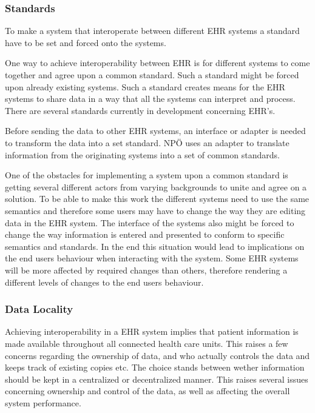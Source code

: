 \documentclass[14pt]{article}
\begin{document}
\subsubsection{Standards}
\label{sec:resultsStandards}
To make a system that interoperate between different \gls{EHR} systems a standard have to be set and forced onto the systems. 

One way to achieve interoperability between \gls{EHR} is for different systems to come together and agree upon a common standard. Such a standard might be forced upon already existing systems. Such a standard creates means for the \gls{EHR} systems to share data in a way that all the systems can interpret and process. There are several standards currently in development concerning \gls{EHR}'s.

Before sending the data to other \gls{EHR} systems, an interface or adapter is needed to transform the data into a set standard. NPÖ uses an adapter to translate information from the originating systems into a set of common standards. 

One of the obstacles for implementing a system upon a common standard is getting several different actors from varying backgrounds to unite and agree on a solution. To be able to make this work the different systems need to use the same semantics and therefore some users may have to change the way they are editing data in the \gls{EHR} system. The interface of the systems also might be forced to change the way information is entered and presented to conform to specific semantics and standards. In the end this situation would lead to implications on the end users behaviour when interacting with the system. Some \gls{EHR} systems will be more affected by required changes than others, therefore rendering a different levels of changes to the end users behaviour.

\subsubsection{Data Locality}
\label{sec:resultsLocality}

Achieving interoperability in a \gls{EHR} system implies that patient information is made available throughout all connected health care units. This raises a few concerns regarding the ownership of data, and who actually controls the data and keeps track of existing copies etc. The choice stands between wether information should be kept in a centralized or decentralized manner. This raises several issues concerning ownership and control of the data, as well as affecting the overall system performance.
\end{document}
